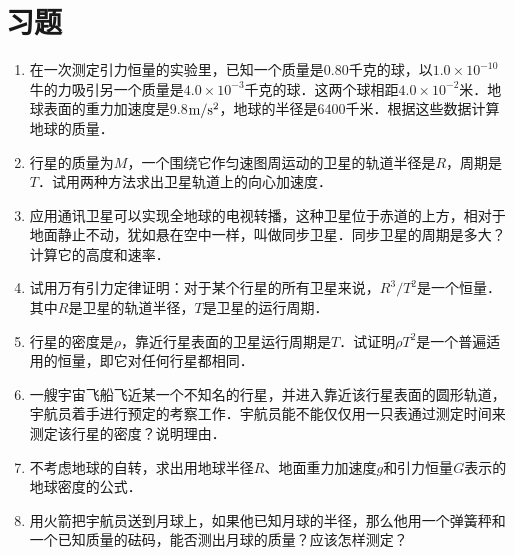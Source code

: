 \section*{习题}
\begin{enumerate}
	\item 在一次测定引力恒量的实验里，已知一个质量是0.80千克的球，以$1.0\times 10^{-10}$牛的力吸引另一个质量是$4.0\times 10^{-3}$千克的球．这两个球相距$4.0\times 10^{-2}$米．地球表面的重力加速度是9.8$\text{m}/\text{s}^2$，地球的半径是6400千米．根据这些数据计算地球的质量．
	\item 行星的质量为$M$，一个围绕它作匀速图周运动的卫星的轨道半径是$R$，周期是$T$．试用两种方法求出卫星轨道上的向心加速度．	
	\item 应用通讯卫星可以实现全地球的电视转播，这种卫星位于赤道的上方，相对于地面静止不动，犹如悬在空中一样，叫做同步卫星．同步卫星的周期是多大？计算它的高度和速率．
	\item 试用万有引力定律证明：对于某个行星的所有卫星来说，$R^3/T^2$是一个恒量．其中$R$是卫星的轨道半径，$T$是卫星的运行周期．
	\item 行星的密度是$\rho$，靠近行星表面的卫星运行周期是$T$．试证明$\rho T^2$是一个普遍适用的恒量，即它对任何行星都相同．
	\item 一艘宇宙飞船飞近某一个不知名的行星，并进入靠近该行星表面的圆形轨道，宇航员着手进行预定的考察工作．宇航员能不能仅仅用一只表通过测定时间来测定该行星的密度？说明理由．
	\item 不考虑地球的自转，求出用地球半径$R$、地面重力加速度$g$和引力恒量$G$表示的地球密度的公式．
	\item 用火箭把宇航员送到月球上，如果他已知月球的半径，那么他用一个弹簧秤和一个已知质量的砝码，能否测出月球的质量？应该怎样测定？	


\end{enumerate}
	
	
	
	
	
	
	
	
	
	
	
	
	
	
		
	
	
	
	
	
	
	
	
	
	
	
	
	
	
	
	
	
	
	
	
	
	
	
	
	
	
	
	

